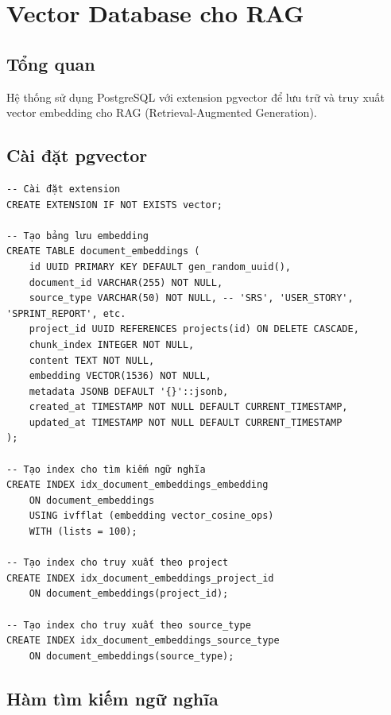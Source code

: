 \documentclass[12pt,a4paper]{report}
\begin{document}
\section{Vector Database cho RAG}

\subsection{Tổng quan}

Hệ thống sử dụng PostgreSQL với extension pgvector để lưu trữ và truy xuất vector embedding cho RAG (Retrieval-Augmented Generation).

\subsection{Cài đặt pgvector}

\begin{verbatim}
-- Cài đặt extension
CREATE EXTENSION IF NOT EXISTS vector;

-- Tạo bảng lưu embedding
CREATE TABLE document_embeddings (
    id UUID PRIMARY KEY DEFAULT gen_random_uuid(),
    document_id VARCHAR(255) NOT NULL,
    source_type VARCHAR(50) NOT NULL, -- 'SRS', 'USER_STORY', 'SPRINT_REPORT', etc.
    project_id UUID REFERENCES projects(id) ON DELETE CASCADE,
    chunk_index INTEGER NOT NULL,
    content TEXT NOT NULL,
    embedding VECTOR(1536) NOT NULL,
    metadata JSONB DEFAULT '{}'::jsonb,
    created_at TIMESTAMP NOT NULL DEFAULT CURRENT_TIMESTAMP,
    updated_at TIMESTAMP NOT NULL DEFAULT CURRENT_TIMESTAMP
);

-- Tạo index cho tìm kiếm ngữ nghĩa
CREATE INDEX idx_document_embeddings_embedding
    ON document_embeddings
    USING ivfflat (embedding vector_cosine_ops)
    WITH (lists = 100);

-- Tạo index cho truy xuất theo project
CREATE INDEX idx_document_embeddings_project_id
    ON document_embeddings(project_id);

-- Tạo index cho truy xuất theo source_type
CREATE INDEX idx_document_embeddings_source_type
    ON document_embeddings(source_type);
\end{verbatim}

\subsection{Hàm tìm kiếm ngữ nghĩa}
\end{document}

